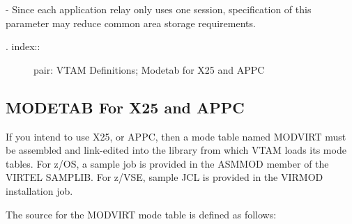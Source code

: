 \documentclass[letterpaper,10pt,english]{sphinxmanual}
\begin{document}
 - Since each application relay only uses one session, specification of this parameter may reduce common area storage requirements.
\begin{description}
\item[{. index::}] \leavevmode
pair: VTAM Definitions; Modetab for X25 and APPC

\end{description}


\subsection{MODETAB For X25 and APPC}
\label{\detokenize{Installation_Guide:modetab-for-x25-and-appc}}
If you intend to use X25, or APPC, then a mode table named MODVIRT must be assembled and link-edited into the library from which VTAM loads its mode tables. For z/OS, a sample job is provided     in the ASMMOD member of the VIRTEL SAMPLIB. For z/VSE, sample JCL is provided in the VIRMOD installation job.

The source for the MODVIRT mode table is defined as follows:
\end{document}
